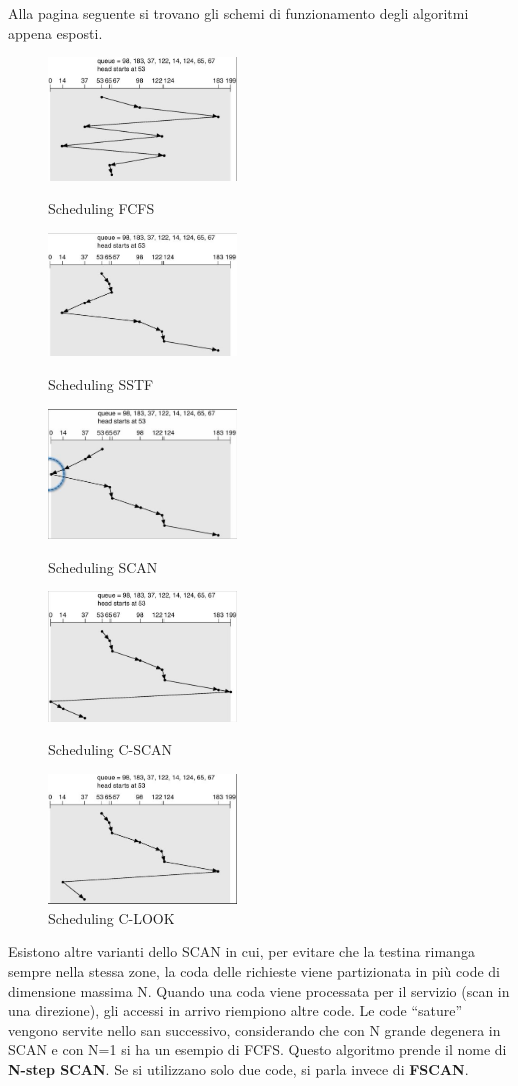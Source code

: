 \documentclass[a4paper]{article}
\begin{document}
Alla pagina seguente si trovano gli schemi di funzionamento degli algoritmi appena esposti.
\begin{figure}
    \centering
    \includegraphics[width=5cm]{img/fcfs.JPG}
    \caption{Scheduling FCFS}
    \includegraphics[width=5cm]{img/sstf.JPG}
    \caption{Scheduling SSTF}
    \includegraphics[width=5cm]{img/scan.JPG}
    \caption{Scheduling SCAN}
    \includegraphics[width=5cm]{img/cscan.JPG}
    \caption{Scheduling C-SCAN}
    \includegraphics[width=5cm]{img/clook.JPG}
    \caption{Scheduling C-LOOK}
\end{figure}
\newline

Esistono altre varianti dello SCAN in cui, per evitare che la testina rimanga sempre nella stessa zone, la coda delle richieste viene partizionata in più code di dimensione massima N. Quando una coda viene processata per il servizio (scan in una direzione), gli accessi in arrivo riempiono altre code. Le code ``sature'' vengono servite nello san successivo, considerando che con N grande degenera in SCAN e con N=1 si ha un esempio di FCFS. Questo algoritmo prende il nome di \textbf{N-step SCAN}. Se si utilizzano solo due code, si parla invece di \textbf{FSCAN}.
\end{document}
